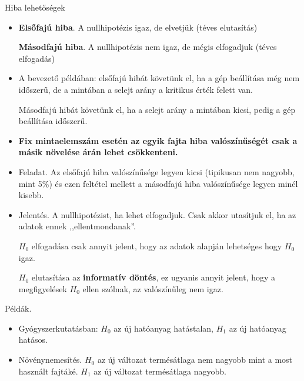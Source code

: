 \documentclass[aspectratio=169,notheorems,9pt,\option]{beamer}
\begin{document}
  
  \begin{frame}{Hiba lehetőségek}
   
    \begin{itemize}
    \item 
    
    \textbf{Elsőfajú hiba}. A nullhipotézis igaz, de elvetjük
      (téves elutasítás)
    
      \textbf{Másodfajú hiba}. A nullhipotézis nem igaz, de mégis elfogadjuk
      (téves elfogadás)
    
    \item A bevezető példában: elsőfajú hibát követünk el, ha a gép beállítása még nem időszerű, 
    de a mintában a selejt arány a kritikus érték felett van.

    Másodfajú hibát követünk el, ha a selejt arány a mintában kicsi, pedig a gép beállítása időszerű.

    \item \textbf{Fix mintaelemszám esetén az egyik fajta hiba valószínűségét
      csak a másik növelése árán lehet csökkenteni.}
      
    \item Feladat. Az elsőfajú hiba valószínűsége legyen kicsi (tipikusan
      nem nagyobb, mint 5\%) és ezen feltétel mellett a másodfajú hiba valószínűsége
      legyen minél kisebb.

    \item Jelentés. A nullhipotézist, ha lehet elfogadjuk. Csak akkor
      utasítjuk el, ha az adatok ennek ,,ellentmondanak''.
  
      $H_0$ elfogadása csak annyit jelent, hogy az adatok alapján lehetséges
      hogy  $H_0$ igaz.
  
      $H_0$ elutasítása az \textbf{informatív döntés}, ez ugyanis annyit jelent,
      hogy a megfigyelések $H_0$ ellen szólnak, az valószínűleg nem igaz.
    \end{itemize}
  

    Példák.
    \begin{itemize}
    \item Gyógyszerkutatásban: $H_0$ az új hatóanyag hatástalan, $H_1$
      az új hatóanyag hatásos. 
    \item Növénynemesítés. $H_0$ az új változat termésátlaga nem nagyobb
      mint a most használt fajtáké. $H_1$ az új változat termésátlaga nagyobb.
    \end{itemize}
    
  \end{frame}
  
\end{document}
